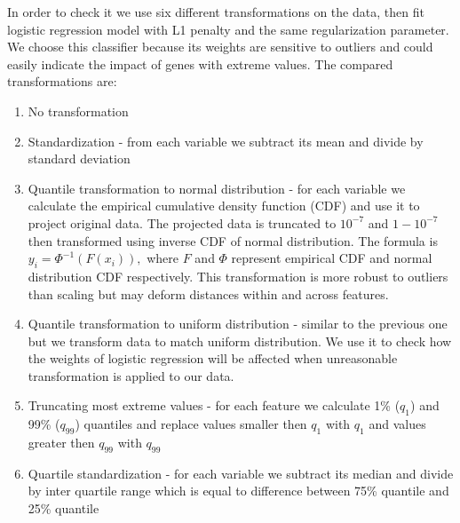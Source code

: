 \documentclass[12pt, wide]{mwart}
\begin{document}
In order to check it we use six different transformations on the data, then fit logistic regression model with L1 penalty and the same regularization parameter. We choose this classifier because its weights are sensitive to outliers and could easily indicate the impact of genes with extreme values. 
The compared transformations are:

\begin{enumerate}
    \item No transformation
    \item Standardization - from each variable we subtract its mean and divide by standard deviation
    \item Quantile transformation to normal distribution - for each variable we calculate the empirical cumulative density function (CDF) and use it to project original data. The projected data is truncated to $10^{-7}$ and $1-10^{-7}$ then transformed using inverse CDF of normal distribution. The formula is $y_{i}=\Phi^{-1}\left(F\left(x_{i}\right)\right),$ where $F$ and $\Phi$ represent empirical CDF and normal distribution CDF respectively. This transformation is more robust to outliers than scaling but may deform distances within and across features.
    \item Quantile transformation to uniform distribution - similar to the previous one but we transform data to match uniform distribution. We use it to check how the weights of logistic regression will be affected when unreasonable transformation is applied to our data.
    \item Truncating most extreme values - for each feature we calculate 1\% ($q_1$) and 99\% ($q_{99}$) quantiles and replace values smaller then $q_1$ with $q_1$ and values greater then $q_{99}$ with $q_{99}$
    \item Quartile standardization - for each variable we subtract its median and divide by inter quartile range which is equal to difference between 75\% quantile and 25\% quantile
\end{enumerate}
\end{document}

